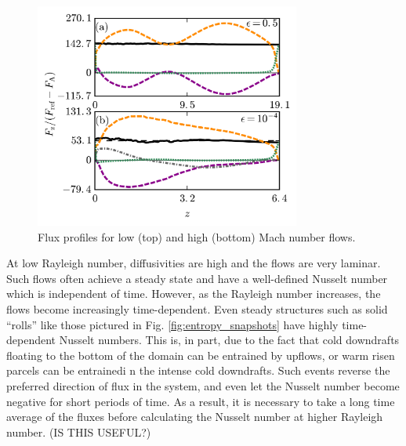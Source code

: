 \documentclass[aps, prl, twocolumn, groupedaddress, amsfonts, amssymb, amsmath]{revtex4-1}
\begin{document}
\begin{figure}[t]
\includegraphics[width=3.4375in]{./figs/fluxes_fig.png}
\caption{Flux profiles for low (top) and high (bottom) Mach number flows.  
\label{fig:flux_profiles} }
\end{figure}

At low Rayleigh number, diffusivities are high and the flows are very laminar.  Such flows often achieve a
steady state and have a well-defined Nusselt number which is independent of time.  However, as the Rayleigh
number increases, the flows become increasingly time-dependent.  Even steady structures such as solid
``rolls'' like those pictured in Fig. \ref{fig:entropy_snapshots} have highly time-dependent Nusselt numbers.
This is, in part, due to the fact that cold downdrafts floating to the bottom of the domain can be entrained
by upflows, or warm risen parcels can be entrainedi n the intense cold downdrafts.  Such events reverse the
preferred direction of flux in the system, and even let the Nusselt number become negative for short periods of
time.  As a result, it is necessary to take a long time average of the fluxes
before calculating the Nusselt number at higher Rayleigh number. (IS THIS USEFUL?)

%
\end{document}
